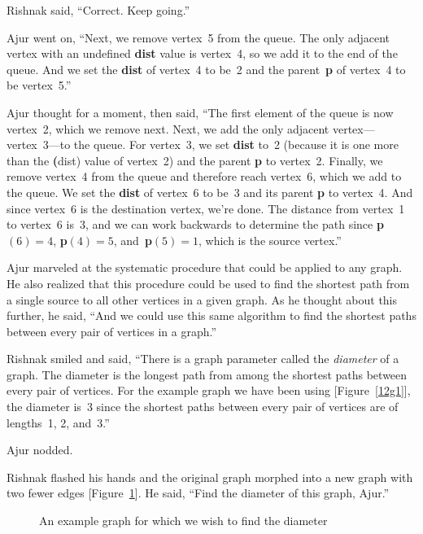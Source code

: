 Rishnak said, ``Correct. Keep going.''

Ajur went on, ``Next, we remove vertex~5 from the queue. The only adjacent vertex with an undefined \textbf{dist} value is vertex~4, so we add it to the end of the queue. And we set the \textbf{dist} of vertex~4 to be~2 and the parent~\textbf{p} of vertex~4 to be vertex~5.''

Ajur thought for a moment, then said, ``The first element of the queue is now vertex~2, which we remove next. Next, we add the only adjacent vertex---vertex~3---to the queue. For vertex~3, we set \textbf{dist} to~2 (because it is one more than the \textbf(dist) value of vertex~2) and the parent \textbf{p} to vertex~2. Finally, we remove vertex~4 from the queue and therefore reach vertex~6, which we add to the queue. We set the \textbf{dist} of vertex~6 to be~3 and its parent \textbf{p} to vertex~4. And since vertex~6 is the destination vertex, we're done. The distance from vertex~1 to vertex~6 is~3, and we can work backwards to determine the path since \textbf{p}$(6)=4$, \textbf{p}$(4)=5$, and~\textbf{p}$(5)=1$, which is the source vertex.''

Ajur marveled at the systematic procedure that could be applied to any graph. He also realized that this procedure could be used to find the shortest path from a single source to all other vertices in a given graph. As he thought about this further, he said, ``And we could use this same algorithm to find the shortest paths between every pair of vertices in a graph.''

Rishnak smiled and said, ``There is a graph parameter called the \textit{diameter} of a graph. The diameter is the longest path from among the shortest paths between every pair of vertices. For the example graph we have been using [Figure~\ref{12g1}], the diameter is~3 since the shortest paths between every pair of vertices are of lengths~1, 2, and~3.''

Ajur nodded.

Rishnak flashed his hands and the original graph morphed into a new graph with two fewer edges [Figure~\ref{12g3}].  He said, ``Find the diameter of this graph, Ajur.''

\begin{figure}
\begin{center}
\caption{An example graph for which we wish to find the diameter}\label{12g3}
\end{center}
\end{figure}

